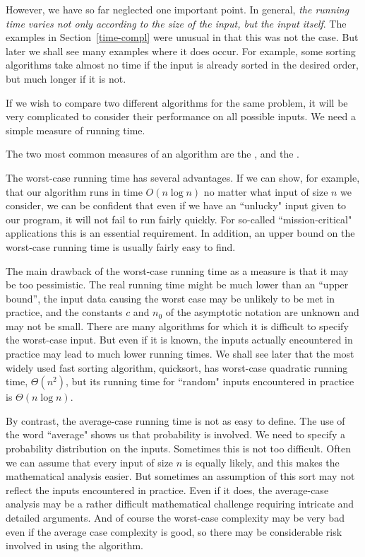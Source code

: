 However, we have so far neglected one important point. In general,
\emph{the running time varies not only according to the size of the
input, but the input itself}. The examples in Section~\ref{time-compl} 
were unusual
in that this was not the case. But later we shall see many examples
where it does occur. For example, some sorting algorithms take almost
no time if the input is already sorted in the desired order, but much
longer if it is not.

If we wish to compare two different algorithms for the same problem, it
will be very complicated to consider their performance on all possible
inputs. We need a simple measure of running time.

The two most common measures of an algorithm are the , and the . 

The worst-case running time has several advantages.  If we can show,
for example, that our algorithm runs in time $O(n\log n)$ no matter
what input of size $n$ we consider, we can be confident that even if we
have an ``unlucky" input given to our program, it will not fail to run
fairly quickly. For so-called ``mission-critical" applications this is
an essential requirement. In addition, an upper bound on the worst-case
running time is usually fairly easy to find.

The main drawback of the worst-case running time as a measure is that it may be 
too pessimistic. The real running time might be much lower than
an ``upper bound'', the input data causing  the worst case may be
unlikely to be met in practice, and the constants $c$ and $n_{0}$ of the 
asymptotic notation  are unknown and may not be small.
There are many algorithms for which it is difficult to specify the worst-case 
input. But even if it is known, the inputs actually encountered in practice may 
lead to much lower running times. We
shall see later that the most widely used fast sorting
algorithm, quicksort, has worst-case quadratic
running time, $\Theta(n^{2})$, but its running time
for ``random" inputs encountered in practice is $\Theta(n \log n)$.

By contrast, the average-case running time is not as easy to define. The use of 
the word ``average" shows us that probability is involved. We need to specify a 
probability distribution on the inputs. Sometimes this is not too difficult. 
Often we can assume that every input of size $n$ is equally likely, and this 
makes the mathematical analysis easier. But sometimes an assumption of this sort
 may not reflect the inputs encountered in practice. Even if it does, the
average-case analysis may be a rather difficult mathematical challenge
requiring intricate and detailed arguments. And of course the worst-case 
complexity may be very bad even if the average case complexity is good, so there
 may be considerable risk involved in using the algorithm.

